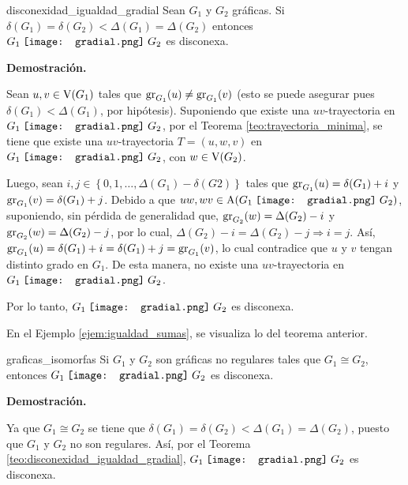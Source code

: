 \documentclass[fleqn, 11pt]{beamer}
\newcommand{\gradial}{\hspace{0.9mm} \texttt{[image: gradial.png]} \hspace{1mm}}
\begin{document}
    \begin{teorema}[breakable, pad at break = 4mm, beforeafter skip = 4mm]{}{disconexidad_igualdad_gradial}
        Sean $ G_1 $ y $ G_2 $ gráficas. Si $ \delta(G_1) = \delta(G_2) < \Delta(G_1) = \Delta(G_2) $ entonces $ G_1 \gradial G_2 $ es disconexa.
        
        \tcblower

        \textbf{Demostración.} \vspace{3mm}

        Sean $ u,v \in \textnormal{V}(G_1) $ tales que $ \textnormal{gr}_{G_1}(u) \neq \textnormal{gr}_{G_1}(v) $ (esto se puede asegurar pues $ \delta(G_1) < \Delta(G_1) $, por hipótesis). Suponiendo que existe una $ uv $-trayectoria en $ G_1 \gradial G_2 $, por el Teorema \eqref{teo:trayectoria_minima}, se tiene que existe una $ uv $-trayectoria $ T = (u,w,v) $ en $ G_1 \gradial G_2 $, con $ w \in \textnormal{V}(G_2) $. \vspace{2mm}

        Luego, sean $ i, j \in \left\lbrace 0, 1, \ldots, \Delta(G_1) - \delta(G2) \right\rbrace $ tales que $ \textnormal{gr}_{G_1}(u) = \delta(G_1) + i $ y $ \textnormal{gr}_{G_1}(v) = \delta(G_1) + j $. Debido a que $ uw, wv \in \textnormal{A}(G_1 \gradial G_2) $, suponiendo, sin pérdida de generalidad que, $ \textnormal{gr}_{G_2}(w) = \Delta(G_2) - i $ y $ \textnormal{gr}_{G_2}(w) = \Delta(G_2) - j $, por lo cual, $ \Delta(G_2) - i = \Delta(G_2) - j \Longrightarrow i = j $. Así, $ \textnormal{gr}_{G_1}(u) = \delta(G_1) + i = \delta(G_1) + j = \textnormal{gr}_{G_1}(v) $, lo cual contradice que $ u $ y $ v $ tengan distinto grado en $ G_1 $. De esta manera, no existe una $ uv $-trayectoria en $ G_1 \gradial G_2 $. \vspace{2mm}

        Por lo tanto, $ G_1 \gradial G_2 $ es disconexa.
    \end{teorema}

    En el Ejemplo \eqref{ejem:igualdad_sumas}, se visualiza lo del teorema anterior.

    \begin{corolario}[breakable, pad at break = 4mm, beforeafter skip = 4mm]{}{graficas_isomorfas}
        Si $ G_1 $ y $ G_2 $ son gráficas no regulares tales que $ G_1 \cong G_2 $, entonces $ G_1 \gradial G_2 $ es disconexa.

        \tcblower

        \textbf{Demostración.} \vspace{3mm}

        Ya que $ G_1 \cong G_2 $ se tiene que $ \delta(G_1) = \delta(G_2) < \Delta(G_1) = \Delta(G_2) $, puesto que $ G_1 $ y $ G_2 $ no son regulares. Así, por el Teorema \eqref{teo:disconexidad_igualdad_gradial}, $ G_1 \gradial G_2 $ es disconexa.
    \end{corolario}
\end{document}
